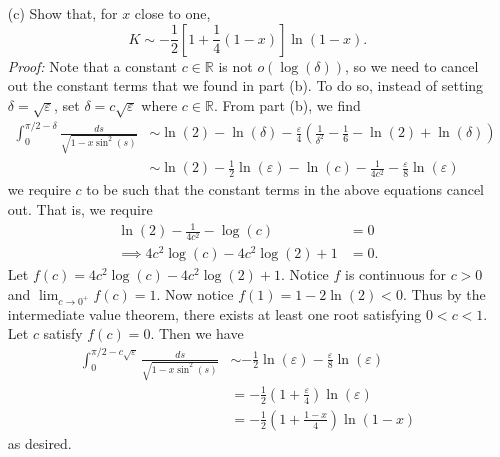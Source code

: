\documentclass{article}
\begin{document}
\begin{itemize}
\begin{itemize}
        \item[(c)] Show that, for $x$ close to one, 
        \[K \sim -\frac{1}{2}\left[1 + \frac{1}{4}(1 - x)\right]\ln(1 - x).\]
        \textit{Proof:} Note that a constant $c\in \mathbb{R}$ is not $o(\log(\delta))$, so we need to cancel out the constant terms that we found in part (b). To do so, instead of setting $\delta = \sqrt{\varepsilon}$, set $\delta = c\sqrt{\varepsilon}$ where $c \in \mathbb{R}$. From part (b), we find
        \begin{align*}
            \int_0^{\pi/2 - \delta} \frac{ds}{\sqrt{1 - x\sin^2(s)}} &\sim \ln(2) - \ln(\delta) - \frac{\varepsilon}{4}\left(\frac{1}{\delta^2} - \frac{1}{6} - \ln(2) + \ln(\delta)\right)\\
            &\sim \ln(2) - \frac{1}{2}\ln(\varepsilon) - \ln(c) -\frac{1}{4c^2} - \frac{\varepsilon}{8}\ln(\varepsilon)
        \end{align*}
        we require $c$ to be such that the constant terms in the above equations cancel out. That is, we require
        \begin{align*}
            \ln(2) - \frac{1}{4c^2} - \log(c) &= 0\\
            \implies 4c^2\log(c) - 4c^2 \log(2) + 1 &= 0.
        \end{align*}
        Let $f(c) = 4c^2\log(c) - 4c^2\log(2) + 1$. Notice $f$ is continuous for $c > 0$ and $\lim_{c \to 0^+} f(c) = 1$. Now notice $f(1) = 1 - 2\ln(2) < 0$. Thus by the intermediate value theorem, there exists at least one root satisfying $0 < c < 1$. Let $c$ satisfy $f(c) = 0$. Then we have
        \begin{align*}
            \int_0^{\pi/2 - c\sqrt{\varepsilon}}\frac{ds}{\sqrt{1 - x\sin^2(s)}} &\sim -\frac{1}{2}\ln(\varepsilon) - \frac{\varepsilon}{8}\ln(\varepsilon)\\
            &= -\frac{1}{2}\left(1 + \frac{\varepsilon}{4}\right)\ln(\varepsilon)\\
            &= -\frac{1}{2}\left(1 + \frac{1-x}{4}\right)\ln(1-x)
        \end{align*}
        as desired.
    \end{itemize}

    \pagebreak


\end{itemize}
\end{document}
